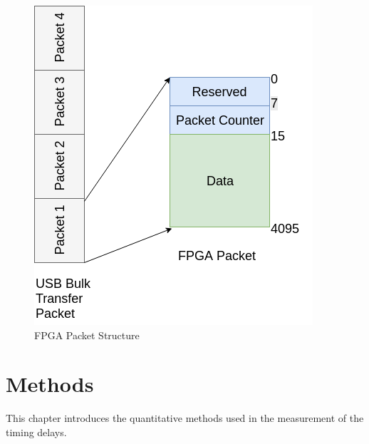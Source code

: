 \documentclass{kththesis}
\begin{document}
\begin{figure}[h!]
\centering
\includegraphics[scale=0.6]{FPGA_Packet.png}
\caption{FPGA Packet Structure}
\label{fpga_packet}
\end{figure}

\chapter{Methods}
This chapter introduces the quantitative methods used in the measurement of the timing delays. 
\end{document}
